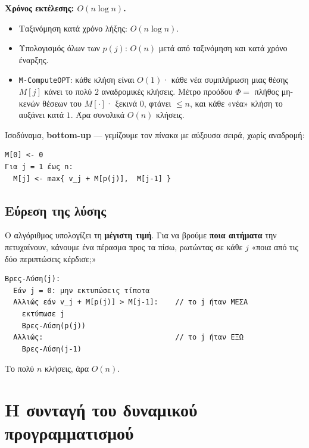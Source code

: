 \documentclass[11pt,a4paper]{article}
\begin{document}
\begin{keypoint}
\textbf{Χρόνος εκτέλεσης: $O(n \log n)$.}
\begin{itemize}
  \item Ταξινόμηση κατά χρόνο λήξης: $O(n \log n)$.
  \item Υπολογισμός όλων των $p(j)$: $O(n)$ μετά από ταξινόμηση και κατά χρόνο
  έναρξης.
  \item \texttt{M-ComputeOPT}: κάθε κλήση είναι $O(1)$· κάθε νέα συμπλήρωση μιας
  θέσης $M[j]$ κάνει το πολύ $2$ αναδρομικές κλήσεις. Μέτρο προόδου $\Phi = $
  πλήθος μη-κενών θέσεων του $M[\cdot]$· ξεκινά $0$, φτάνει $\le n$, και κάθε
  «νέα» κλήση το αυξάνει κατά $1$. Άρα συνολικά $O(n)$ κλήσεις.
\end{itemize}
\end{keypoint}

Ισοδύναμα, \textbf{bottom-up} --- γεμίζουμε τον πίνακα με αύξουσα σειρά, χωρίς
αναδρομή:

\begin{codebox}
\begin{verbatim}
M[0] <- 0
Για j = 1 έως n:
  M[j] <- max{ v_j + M[p(j)],  M[j-1] }
\end{verbatim}
\end{codebox}

\subsection{Εύρεση της λύσης}

Ο αλγόριθμος υπολογίζει τη \textbf{μέγιστη τιμή}. Για να βρούμε \textbf{ποια
αιτήματα} την πετυχαίνουν, κάνουμε ένα πέρασμα προς τα πίσω, ρωτώντας σε κάθε $j$
«ποια από τις δύο περιπτώσεις κέρδισε;»

\begin{codebox}
\begin{verbatim}
Βρες-Λύση(j):
  Εάν j = 0: μην εκτυπώσεις τίποτα
  Αλλιώς εάν v_j + M[p(j)] > M[j-1]:    // το j ήταν ΜΕΣΑ
    εκτύπωσε j
    Βρες-Λύση(p(j))
  Αλλιώς:                               // το j ήταν ΕΞΩ
    Βρες-Λύση(j-1)
\end{verbatim}
\end{codebox}

Το πολύ $n$ κλήσεις, άρα $O(n)$.

\section{Η συνταγή του δυναμικού προγραμματισμού}
\end{document}
